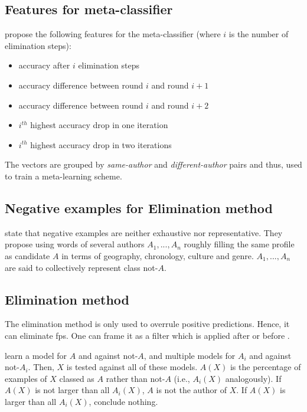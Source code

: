 \subsection{Features for meta-classifier}
\citet{koppel_authorship_2004} propose the following features for the meta-classifier 
(where $i$ is the number of elimination steps):
\begin{itemize}
    \item accuracy after $i$ elimination steps
    \item accuracy difference between round $i$ and round $i+1$
    \item accuracy difference between round $i$ and round $i+2$
    \item $i^{th}$ highest accuracy drop in one iteration
    \item $i^{th}$ highest accuracy drop in two iterations
\end{itemize}

The vectors are grouped by \emph{same-author} and \emph{different-author} pairs and thus, 
used to train a meta-learning scheme.

\subsection{Negative examples for Elimination method}
\citet{koppel_authorship_2004} state that negative examples are neither exhaustive nor representative.
They propose using words of several authors $A_1, ..., A_n$ roughly filling the same profile as candidate $A$ 
in terms of geography, chronology, culture and genre.
$A_1, ..., A_n$ are said to collectively represent class not-$A$.

\subsection{Elimination method}

The elimination method is only used to overrule positive predictions.
Hence, it can eliminate \acp{fp}.
One can frame it as a filter which is applied after or before \unmasking{}.

\citet{koppel_authorship_2004} learn a model for $A$ and against not-$A$, 
and multiple models for $A_i$ and against not-$A_i$.
Then, $X$ is tested against all of these models.
$A(X)$ is the percentage of examples of $X$ classed as $A$ rather than not-$A$ 
(i.e., $A_i(X)$ analogously).
If $A(X)$ is not larger than all $A_i(X)$, $A$ is not the author of $X$.
If $A(X)$ is larger than all $A_i(X)$, conclude nothing.

